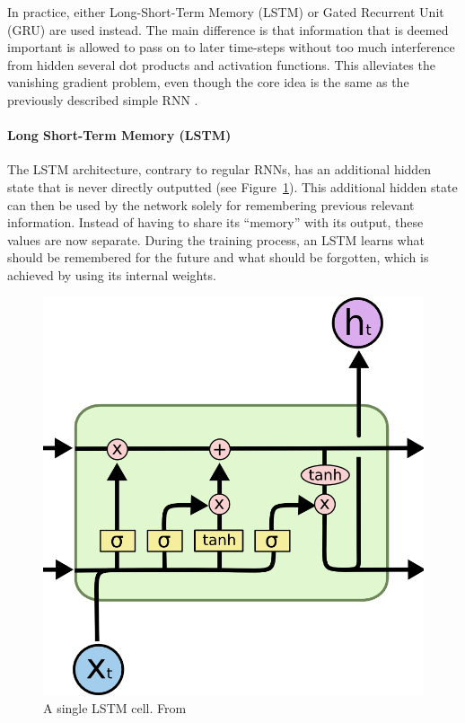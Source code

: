             In practice, either Long-Short-Term Memory (LSTM) or Gated Recurrent Unit (GRU) are used instead. 
            The main difference is that information that is deemed important is allowed to pass on to later time-steps without too much interference from hidden several dot products and activation functions. 
            This alleviates the vanishing gradient problem, even though the core idea is the same as the previously described simple RNN \cite{chollet2017deep}.


            \paragraph{Long Short-Term Memory (LSTM)} The LSTM architecture, contrary to regular RNNs, has an additional hidden state that is never directly outputted (see Figure~\ref{fig:lstm_cell}). 
            This additional hidden state can then be used by the network solely for remembering previous relevant information. 
            Instead of having to share its ``memory'' with its output, these values are now separate. 
            During the training process, an LSTM learns what should be remembered for the future and what should be forgotten, which is achieved by using its internal weights.

            \begin{figure}[h!]
                \begin{center}
                    \includegraphics[scale=0.5]{figures/lstm_cell.png}
                \end{center}
                \caption{A single LSTM cell. From~\cite{olah2015understanding}\label{fig:lstm_cell}}
            \end{figure}

